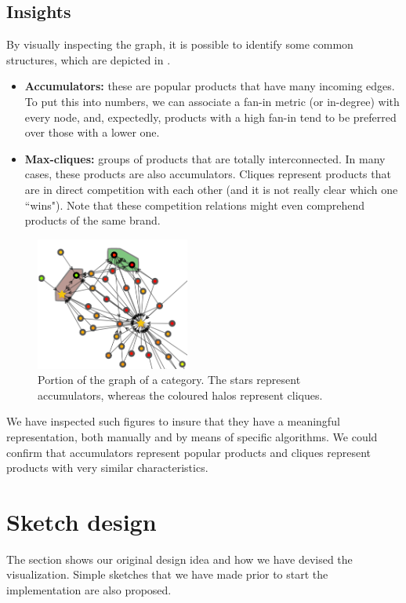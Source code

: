 \documentclass[a4paper,12pt]{article}
\begin{document}
\subsection{Insights}
By visually inspecting the graph, it is possible to identify some common structures, which are depicted in .
\begin{itemize}
	\item \textbf{Accumulators:} these are popular products that have many incoming edges. To put this into numbers, we can associate a fan-in metric (or in-degree) with every node, and, expectedly, products with a high fan-in tend to be preferred over those with a lower one.
	\item \textbf{Max-cliques:} groups of products that are totally interconnected. In many cases, these products are also accumulators. Cliques represent products that are in direct competition with each other (and it is not really clear which one ``wins"). Note that these competition relations might even comprehend products of the same brand.
\end{itemize}
\begin{figure}
	\centering{}
	\includegraphics[width=0.45\textwidth]{img/insights.png}
	\caption{Portion of the graph of a category. The stars represent accumulators, whereas the coloured halos represent cliques.}
	\label{fig:insights}
\end{figure}
We have inspected such figures to insure that they have a meaningful representation, both manually and by means of specific algorithms. We could confirm that accumulators represent popular products and cliques represent products with very similar characteristics.

\section{Sketch design}
\label{sec:sketch}
The section shows our original design idea and how we have devised the visualization. Simple sketches that we have made prior to start the implementation are also proposed.
\end{document}

